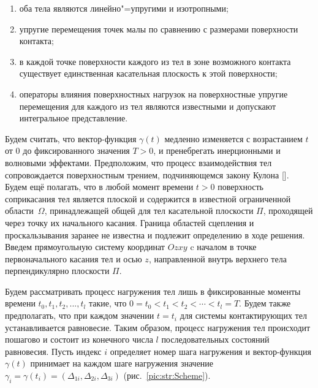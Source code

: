 \begin{enumerate}
\item  оба тела являются линейно"=упругими и изотропными;

\item  упругие перемещения точек малы по сравнению с размерами поверхности контакта;

\item  в каждой точке поверхности каждого из тел в зоне возможного контакта существует единственная касательная плоскость к этой поверхности;

\item  операторы влияния поверхностных нагрузок на поверхностные упругие перемещения для каждого из тел являются известными и допускают интегральное представление.
\end{enumerate}

Будем считать, что вектор-функция $\gamma \left(t\right)$ медленно изменяется с возрастанием $t$ от $0$ до фиксированного значения $T>0$, и пренебрегать инерционными и волновыми эффектами.
Предположим, что процесс взаимодействия тел сопровождается поверхностным трением, подчиняющемся закону  Кулона [].
 Будем ещё полагать, что в любой момент времени $t>0$ поверхность соприкасания тел является плоской и содержится в известной ограниченной облас\-ти~$\Omega $, принадлежащей общей для тел касательной плоскости $\Pi $, проходящей через точку их начального касания.
Граница областей сцепления и проскальзывания заранее не известна и подлежит определению в ходе решения.
Введем прямоугольную систему координат $Ozxy$ c началом в точке первоначального касания тел и осью $z$, направленной внутрь верхнего тела перпендикулярно плоскости $\Pi $.

Будем рассматривать процесс нагружения тел лишь в фиксированные моменты времени $t_{0},t_{1},t_{2},...,t_{l}$ такие, что $0=t_{0} <t_{1} <t_{2} <\cdots<t_{l} =T$.
Будем также предполагать, что при каждом значении $t=t_{i}$ для системы контактирующих тел устанавливается равновесие.
Таким образом, процесс нагружения тел происходит пошагово и состоит из конечного числа $l$ последовательных состояний равновесия.
Пусть индекс $i$ определяет номер шага нагружения и вектор-функция $\gamma \left(t\right)$  принимает на каждом шаге нагружения значение $\gamma _{i} = \gamma \left(t_{i}\right) = \left(\Delta _{1i} ,\Delta _{2i} ,\Delta _{3i} \right)$ (рис.~\ref{pic:str:Scheme}).



